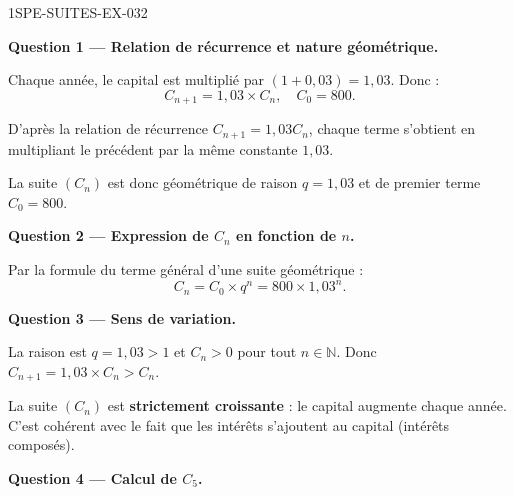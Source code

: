 \begin{corrige}{1SPE-SUITES-EX-032}

\textbf{Question 1 — Relation de récurrence et nature géométrique.}

Chaque année, le capital est multiplié par $(1 + 0{,}03) = 1{,}03$. Donc :
\[
  C_{n+1} = 1{,}03 \times C_n, \quad C_0 = 800.
\]

D'après la relation de récurrence $C_{n+1}=1{,}03C_n$, chaque terme
s'obtient en multipliant le précédent par la même constante $1{,}03$.


La suite $(C_n)$ est donc géométrique de raison $q = 1{,}03$ et de premier terme $C_0 = 800$.

\medskip
\textbf{Question 2 — Expression de $C_n$ en fonction de $n$.}

Par la formule du terme général d'une suite géométrique :
\[
  C_n = C_0 \times q^n = 800 \times 1{,}03^n.
\]

\medskip
\textbf{Question 3 — Sens de variation.}

La raison est $q = 1{,}03 > 1$ et $C_n > 0$ pour tout $n \in \mathbb{N}$. Donc $C_{n+1} = 1{,}03 \times C_n > C_n$.


La suite $(C_n)$ est \textbf{strictement croissante} : le capital augmente chaque année. C'est cohérent avec le fait que les intérêts s'ajoutent au capital (intérêts composés).

\medskip
\textbf{Question 4 — Calcul de $C_5$.}


\end{corrige}
